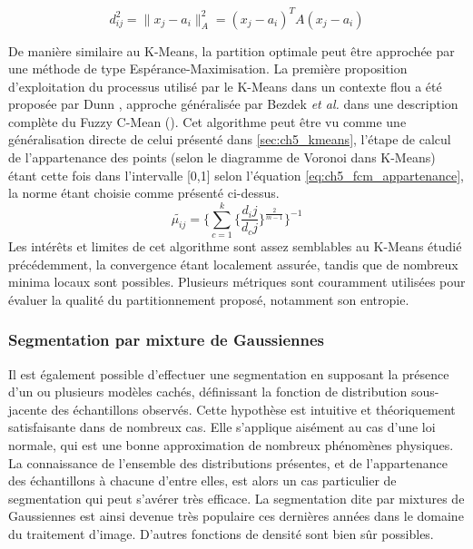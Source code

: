 \begin{equation} \label{eq:ch5_fcm_norm}
	d_{ij}^2 = \lVert x_j - a_i \rVert_A^2 = (x_j - a_i)^T A (x_j - a_i)
\end{equation}

De manière similaire au K-Means, la partition optimale peut être approchée par une méthode de type Espérance-Maximisation. La première proposition d'exploitation du processus utilisé par le K-Means dans un contexte \og flou\fg{} a été proposée par Dunn \cite{Dunn1973}, approche généralisée par Bezdek \textit{et al.} dans une description complète du \og Fuzzy C-Mean\fg{} (\cite{Bezdek1981,Bezdek1984}). Cet algorithme peut être vu comme une généralisation directe de celui présenté dans \ref{sec:ch5_kmeans}, l'étape de calcul de l'appartenance des points (selon le diagramme de Voronoi dans K-Means) étant cette fois dans l'intervalle [0,1] selon l'équation \ref{eq:ch5_fcm_appartenance}, la norme étant choisie comme présenté ci-dessus.
\begin{equation}
	\tilde{\mu_{ij}} = \lbrace \sum\limits_{c=1}^{k} \lbrace \frac{d_ij}{d_cj} \rbrace^{\frac{2}{m-1}} \rbrace^{-1}
	\label{eq:ch5_fcm_appartenance}
\end{equation} %
Les intérêts et limites de cet algorithme sont assez semblables au K-Means étudié précédemment, la convergence étant localement assurée, tandis que de nombreux minima locaux sont possibles. Plusieurs métriques sont couramment utilisées pour évaluer la qualité du partitionnement proposé, notamment son entropie.

\subsubsection{Segmentation par mixture de Gaussiennes}
Il est également possible d'effectuer une segmentation en supposant la présence d'un ou plusieurs modèles cachés, définissant la fonction de distribution sous-jacente des échantillons observés. Cette hypothèse est intuitive et théoriquement satisfaisante dans de nombreux cas. Elle s'applique aisément au cas d'une loi normale, qui est une bonne approximation de nombreux phénomènes physiques. La connaissance de l'ensemble des distributions présentes, et de l'appartenance des échantillons à chacune d'entre elles, est alors un cas particulier de segmentation qui peut s'avérer très efficace. La segmentation dite par \og mixtures de Gaussiennes\fg{} est ainsi devenue très populaire ces dernières années dans le domaine du traitement d'image. D'autres fonctions de densité sont bien sûr possibles.\\

